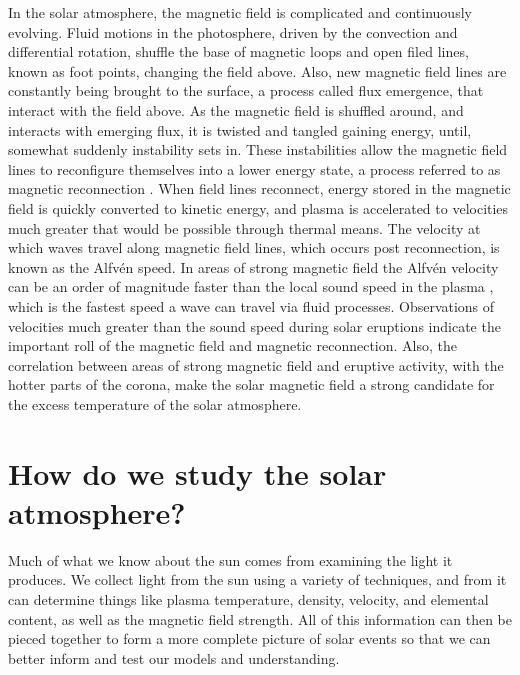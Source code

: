 In the solar atmosphere, the magnetic field is complicated and continuously evolving.
Fluid motions in the photosphere, driven by the convection and differential rotation, shuffle the base of magnetic loops and open filed lines, known as foot points, changing the field above.
Also, new magnetic field lines are constantly being brought to the surface, a process called flux emergence, that interact with the field above.
As the magnetic field is shuffled around, and interacts with emerging flux, it is twisted and tangled gaining energy, until, somewhat suddenly instability sets in.
These instabilities allow the magnetic field lines to reconfigure themselves into a lower energy state, a process referred to as magnetic reconnection \citep{Parker1957,Petschek1964}.
When field lines reconnect, energy stored in the magnetic field is quickly converted to kinetic energy, and plasma is accelerated to velocities much greater that would be possible through thermal means.
The velocity at which waves travel along magnetic field lines, which occurs post reconnection, is known as the Alfv\'en speed. 
In areas of strong magnetic field the Alfv\'en velocity can be an order of magnitude faster than the local sound speed in the plasma \citep{Priest2014}, which is the fastest speed a wave can travel via fluid processes.
Observations of velocities much greater than the sound speed during solar eruptions indicate the important roll of the magnetic field and magnetic reconnection.
Also, the correlation between areas of strong magnetic field and eruptive activity, with the hotter parts of the corona, make the solar magnetic field a strong candidate for the excess temperature of the solar atmosphere.

\section{How do we study the solar atmosphere?}
Much of what we know about the sun comes from examining the light it produces.
We collect light from the sun using a variety of techniques, and from it can determine things like plasma temperature, density, velocity, and elemental content, as well as the magnetic field strength.
All of this information can then be pieced together to form a more complete picture of solar events so that we can better inform and test our models and understanding.

